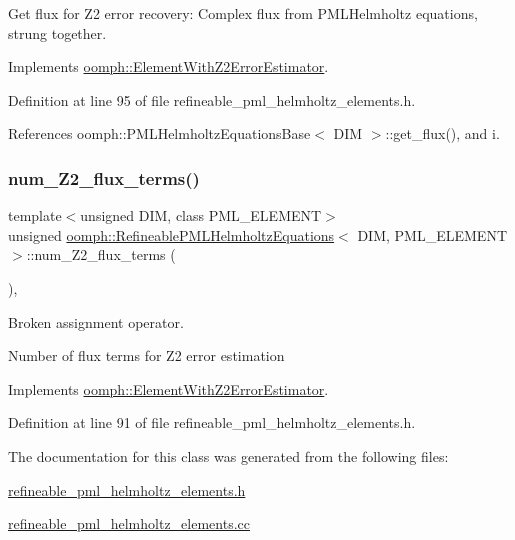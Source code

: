 Get \textquotesingle{}flux\textquotesingle{} for Z2 error recovery\+: Complex flux from P\+M\+L\+Helmholtz equations, strung together. 



Implements \hyperlink{classoomph_1_1ElementWithZ2ErrorEstimator_a5688ff5f546d81771cabad82ca5a7556}{oomph\+::\+Element\+With\+Z2\+Error\+Estimator}.



Definition at line 95 of file refineable\+\_\+pml\+\_\+helmholtz\+\_\+elements.\+h.



References oomph\+::\+P\+M\+L\+Helmholtz\+Equations\+Base$<$ D\+I\+M $>$\+::get\+\_\+flux(), and i.

\mbox{\label{classoomph_1_1RefineablePMLHelmholtzEquations_ace2458391996badfd1c2ef8664a3bc27}} 
\subsubsection{\texorpdfstring{num\+\_\+\+Z2\+\_\+flux\+\_\+terms()}{num\_Z2\_flux\_terms()}}
{\footnotesize\ttfamily template$<$unsigned D\+IM, class P\+M\+L\+\_\+\+E\+L\+E\+M\+E\+NT$>$ \\
unsigned \hyperlink{classoomph_1_1RefineablePMLHelmholtzEquations}{oomph\+::\+Refineable\+P\+M\+L\+Helmholtz\+Equations}$<$ D\+IM, P\+M\+L\+\_\+\+E\+L\+E\+M\+E\+NT $>$\+::num\+\_\+\+Z2\+\_\+flux\+\_\+terms (\begin{DoxyParamCaption}{ }\end{DoxyParamCaption})\hspace{0.3cm}{\ttfamily [inline]}, {\ttfamily [virtual]}}



Broken assignment operator. 

Number of \textquotesingle{}flux\textquotesingle{} terms for Z2 error estimation 

Implements \hyperlink{classoomph_1_1ElementWithZ2ErrorEstimator_ae82c5728902e13da31be19c390fc28e3}{oomph\+::\+Element\+With\+Z2\+Error\+Estimator}.



Definition at line 91 of file refineable\+\_\+pml\+\_\+helmholtz\+\_\+elements.\+h.



The documentation for this class was generated from the following files\+:\begin{DoxyCompactItemize}
\item 
\hyperlink{refineable__pml__helmholtz__elements_8h}{refineable\+\_\+pml\+\_\+helmholtz\+\_\+elements.\+h}\item 
\hyperlink{refineable__pml__helmholtz__elements_8cc}{refineable\+\_\+pml\+\_\+helmholtz\+\_\+elements.\+cc}\end{DoxyCompactItemize}

